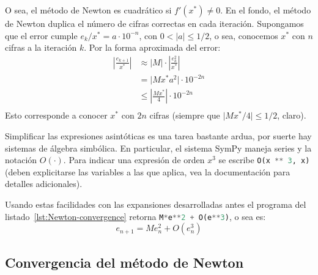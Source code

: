   O sea,
  el método de Newton es cuadrático si \(f'(x^*) \ne 0\).
  En el fondo,
  el método de Newton duplica el número de cifras correctas
  en cada iteración.
  Supongamos que el error cumple \(e_k / x^* = a \cdot 10^{-n}\),
  con \(0 < \lvert a \rvert \le 1/2\),
  o sea,
  conocemos \(x^*\) con \(n\) cifras a la iteración \(k\).
  Por la forma aproximada del error:
  \begin{align*}
    \left \lvert \frac{e_{k + 1}}{x^*} \right\rvert
      &\approx \lvert M \rvert
                  \cdot \left\lvert \frac{e_k^2}{x^*} \right\rvert \\
      &=       \lvert M x^* a^2 \rvert \cdot 10^{-2 n} \\
      &\le     \left\lvert \frac{M x^*}{4} \right\rvert \cdot 10^{-2 n} \\
  \end{align*}
  Esto corresponde a conocer \(x^*\) con \(2 n\) cifras
  (siempre que \(\lvert M x^* / 4 \rvert \le 1/2\),
   claro).

  Simplificar las expresiones asintóticas es una tarea bastante ardua,
  por suerte hay sistemas de álgebra simbólica.
  En particular,
  el sistema SymPy\cite{sympy22:_1.10.1} maneja series
  y la notación \(O(\cdot)\).
  Para indicar una expresión de orden \(x^3\) se escribe
  \lstinline[language = Python]{O(x ** 3, x)}
  (deben explicitarse las variables a las que aplica,
   vea la documentación para detalles adicionales).
  
  Usando estas facilidades
  con las expansiones desarrolladas antes
  el programa del listado~\ref{lst:Newton-convergence}
  retorna \lstinline[language = Python]{M*e**2 + O(e**3)},
  o sea es:
  \begin{equation*}
    e_{n + 1}
      = M e_n^2 + O(e_n^3)
  \end{equation*}

\subsection{Convergencia del método de Newton}
\label{sec:Newton-convergence}

